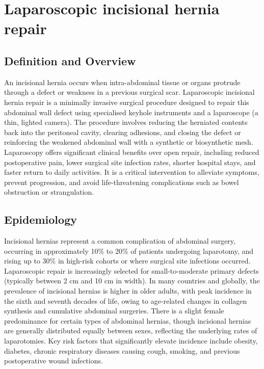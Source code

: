 \chapter{Laparoscopic incisional hernia repair}

\section*{Definition and Overview}
An incisional hernia occurs when intra-abdominal tissue or organs protrude through a defect or weakness in a previous surgical scar. Laparoscopic incisional hernia repair is a minimally invasive surgical procedure designed to repair this abdominal wall defect using specialised keyhole instruments and a laparoscope (a thin, lighted camera). The procedure involves reducing the herniated contents back into the peritoneal cavity, clearing adhesions, and closing the defect or reinforcing the weakened abdominal wall with a synthetic or biosynthetic mesh. Laparoscopy offers significant clinical benefits over open repair, including reduced postoperative pain, lower surgical site infection rates, shorter hospital stays, and faster return to daily activities. It is a critical intervention to alleviate symptoms, prevent progression, and avoid life-threatening complications such as bowel obstruction or strangulation.

\section*{Epidemiology}
Incisional hernias represent a common complication of abdominal surgery, occurring in approximately 10\% to 20\% of patients undergoing laparotomy, and rising up to 30\% in high-risk cohorts or where surgical site infections occurred. Laparoscopic repair is increasingly selected for small-to-moderate primary defects (typically between 2 cm and 10 cm in width). In many countries and globally, the prevalence of incisional hernias is higher in older adults, with peak incidence in the sixth and seventh decades of life, owing to age-related changes in collagen synthesis and cumulative abdominal surgeries. There is a slight female predominance for certain types of abdominal hernias, though incisional hernias are generally distributed equally between sexes, reflecting the underlying rates of laparotomies. Key risk factors that significantly elevate incidence include obesity, diabetes, chronic respiratory diseases causing cough, smoking, and previous postoperative wound infections.


